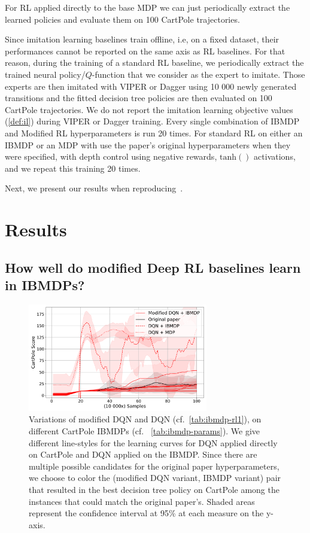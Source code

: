 For RL applied directly to the base MDP we can just periodically extract the learned policies and evaluate them on 100 CartPole trajectories.

Since imitation learning baselines train offline, i.e, on a fixed dataset, their performances cannot be reported on the same axis as RL baselines.
For that reason, during the training of a standard RL baseline, we periodically extract the trained neural policy/$Q$-function that we consider as the expert to imitate.
Those experts are then imitated with VIPER or Dagger using 10 000 newly generated transitions and the fitted decision tree policies are then evaluated on 100 CartPole trajectories.
We do not report the imitation learning objective values (\ref{def:il}) during VIPER or Dagger training.
Every single combination of IBMDP and Modified RL hyperparameters is run 20 times.
For standard RL on either an IBMDP or an MDP with use the paper's original hyperparameters when they were specified, with depth control using negative rewards, $\operatorname{tanh()}$ activations, and we repeat this training 20 times. 

Next, we present our results when reproducing~\cite[Table 1]{topin2021iterative}.

\section{Results}

\subsection{How well do modified Deep RL baselines learn in IBMDPs?}

\begin{figure}
    \centering
    \includegraphics[width=0.7\textwidth]{images/images_part1/dqn.pdf}
    \caption{Variations of modified DQN and DQN (cf.~\ref{tab:ibmdp-rl1}), on different CartPole IBMDPs (cf. ~\ref{tab:ibmdp-params}). We give different line-styles for the learning curves for DQN applied directly on CartPole and DQN applied on the IBMDP.
    Since there are multiple possible candidates for the original paper hyperparameters, we choose to color the (modified DQN variant, IBMDP variant) pair that resulted in the best decision tree policy on CartPole among the instances that could match the original paper's.
    Shaded areas represent the confidence interval at 95\% at each measure on the y-axis.}
\end{figure}\label{fig:res-dqn}

